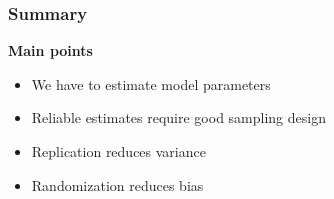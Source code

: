 \documentclass[color=usenames,dvipsnames]{beamer}\usepackage[]{graphicx}\usepackage[]{xcolor}
\begin{document}



\begin{frame}
  \frametitle{Summary}
  \Large
  {\bf Main points}
  \begin{itemize}
    \item We have to estimate model parameters
    \item Reliable estimates require good sampling design
    \item Replication reduces variance
    \item Randomization reduces bias
  \end{itemize}
\end{frame}




















\end{document}

